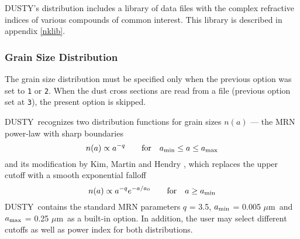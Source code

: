 \documentclass[12pt]{article} \usepackage{epsf}
\def\D  {{\sf DUSTY}}
\def\eq#1{\begin{equation} #1 \end{equation}}
\def\mic    {\hbox{$\mu$m}}
\begin{document}
\D's distribution includes a library of data files with the complex refractive
indices of various compounds of common interest. This library is described in
appendix \ref{nklib}.


\subsubsection          {Grain Size Distribution}

The grain size distribution must be specified only when the previous option was
set to {\tt 1} or {\tt 2}.  When the dust cross sections are read from a file
(previous option set at {\tt 3}), the present option is skipped.

\D\ recognizes two distribution functions for grain sizes $n(a)$ --- the MRN
\cite{MRN77} power-law with sharp boundaries
\eq{
         n(a) \propto a^{-q} \qquad \hbox{for} \quad
                a_{\rm min} \le a \le a_{\rm max}
}
and its modification by Kim, Martin and Hendry \cite{KMH94}, which replaces the
upper cutoff with a smooth exponential falloff
\eq{
  n(a) \propto a^{-q} e^{-a/a_0} \qquad \hbox{for} \quad a \ge a_{\rm min}
}
\D\ contains the standard MRN parameters $q$ = 3.5, $a_{\rm min}$ = 0.005 \mic\
and $a_{\rm max}$ = 0.25 \mic\ as a built-in option.  In addition, the user may
select different cutoffs as well as power index for both distributions.
\end{document}
